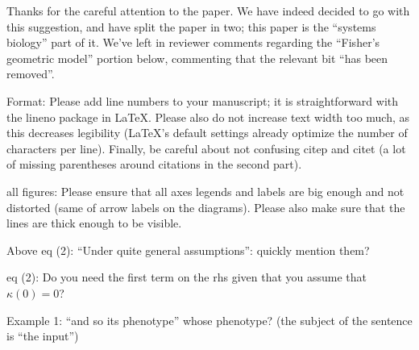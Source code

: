 Thanks for the careful attention to the paper.
We have indeed decided to go with this suggestion,
and have split the paper in two;
this paper is the ``systems biology'' part of it.
We've left in reviewer comments regarding the ``Fisher's geometric model'' portion below,
commenting that the relevant bit ``has been removed''.



\begin{point}{Format:}
    Please add line numbers to your manuscript; it is straightforward
with the lineno package in LaTeX.  Please also do not increase text width too
much, as this decreases legibility (LaTeX's default settings already optimize
the number of characters per line).  Finally, be careful about not confusing
citep and citet (a lot of missing parentheses around citations in the second part).
\end{point}


\begin{point}{all figures:}
    Please ensure that all axes legends and labels are big enough
and not distorted (same of arrow labels on the diagrams). Please also make sure
that the lines are thick enough to be visible.
\end{point}


\begin{point}{Above eq (2):}
    ``Under quite general assumptions'': quickly mention them?
\end{point}


\begin{point}{eq (2):} 
    Do you need the first term on the rhs given that you assume that $\kappa(0)=0$?
\end{point}


\begin{point}{Example 1:}
    ``and so its phenotype'' whose phenotype? (the subject of the sentence is ``the input'')
\end{point}

